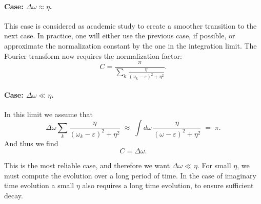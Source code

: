 \paragraph{Case: $\Delta\omega \approx \eta$.}
This case is considered as academic study to create a smoother transition to the next case. In practice, one
will either use the previous case, if possible, or approximate the normalization constant by the one in the integration limit.
The Fourier transform now requires the normalization factor:
\begin{equation*}\label{eq:fft-C-intermediate}
  C = \frac{\pi}{\displaystyle\sum_{k}\frac{\eta}{(\omega_k - \varepsilon)^2 + \eta^2}} .
\end{equation*}


\paragraph{Case: $\Delta\omega \ll \eta$.}
In this limit we assume that
\begin{equation*}\label{eq:fft-sum-to-integral}
  \Delta\omega \sum_{k}\frac{\eta}{(\omega_k - \varepsilon)^2 + \eta^2}
  \;\approx\;
  \int d\omega\,\frac{\eta}{(\omega - \varepsilon)^2 + \eta^2}
  \;=\; \pi .
\end{equation*}
And thus we find
\begin{equation*}\label{eq:fft-C-final}
  C = \Delta\omega .
\end{equation*}

This is the most reliable case, and therefore we want
$\Delta\omega \ll \eta$. For small $\eta$, we must compute the evolution over a long period of time. 
In the case of imaginary time evolution a small $\eta$ also requires a long time 
evolution, to ensure sufficient decay.
